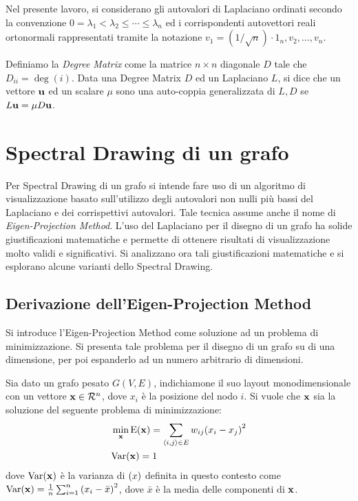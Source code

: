 \documentclass[10pt,a4paper]{article}
\newcommand{\Var}{\mathrm{Var}}
\newcommand{\E}{\mathrm{E}}
\begin{document}
Nel presente lavoro, si considerano gli autovalori di Laplaciano ordinati secondo la convenzione \(0 = \lambda_1 < \lambda_2 \leq \cdots \leq \lambda_n\) ed i corrispondenti autovettori reali ortonormali rappresentati tramite la notazione \(v_1 = (1/\sqrt{n})\cdot 1_n, v_2, \ldots, v_n\).

Definiamo la \textit{Degree Matrix} come la matrice \(n\times n\) diagonale \(D\) tale che \(D_{ii} = \deg(i)\).
Data una Degree Matrix \(D\) ed un Laplaciano \(L\), si dice che un vettore \(\vb{u}\) ed un scalare \(\mu \) sono una auto-coppia generalizzata di \(L,D\) se \(L\vb{u}=\mu D \vb{u}\).

\section{Spectral Drawing di un grafo}\label{sec:spectral_drawing}

Per Spectral Drawing di un grafo si intende fare uso di un algoritmo di visualizzazione basato sull'utilizzo degli autovalori non nulli più bassi del Laplaciano e dei corrispettivi autovalori. Tale tecnica assume anche il nome di \textit{Eigen-Projection Method}.
L'uso del Laplaciano per il disegno di un grafo ha solide giustificazioni matematiche e permette di ottenere risultati di visualizzazione molto validi e significativi.
Si analizzano ora tali giustificazioni matematiche e si esplorano alcune varianti dello Spectral Drawing.

\subsection{Derivazione dell'Eigen-Projection Method}\label{subsec:eigen-projection}

Si introduce l'Eigen-Projection Method come soluzione ad un problema di minimizzazione. Si presenta tale problema per il disegno di un grafo su di una dimensione, per poi espanderlo ad un numero arbitrario di dimensioni.

Sia dato un grafo pesato \(G(V,E)\), indichiamone il suo layout monodimensionale con un vettore \(\vb{x} \in \mathcal{R}^n\), dove \(x_i\) è la posizione del nodo \(i\). Si vuole che \(\vb{x}\) sia la soluzione del seguente problema di minimizzazione:
\begin{align}
    &\min_{\vb{x}} \E(\vb{x}) = \sum_{\langle i, j\rangle \in E} w_{ij}{(x_i - x_j)}^2 \label{eq:minimization}\\
    &\Var(\vb{x}) = 1
\end{align}
dove \(\Var(\vb{x})\) è la varianza di \(\vb(x)\) definita in questo contesto come \(\Var(\vb{x}) = \frac{1}{n}\sum_{i=1}^n {(x_i - \bar{x})}^2\), dove \(\bar{x}\) è la media delle componenti di \(\vb{x}\).
\end{document}
